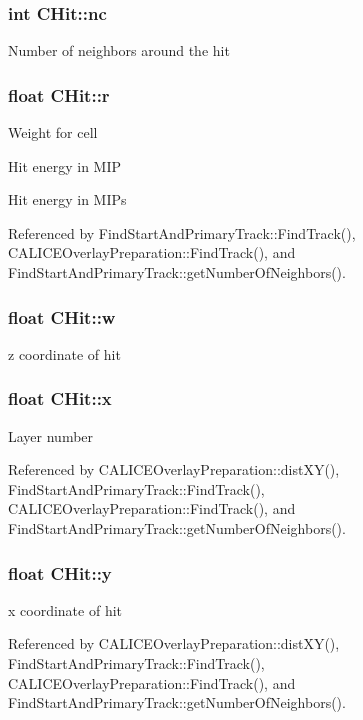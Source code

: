 \subsubsection[{nc}]{\setlength{\rightskip}{0pt plus 5cm}int C\-Hit\-::nc}\label{classCHit_a8002afb784c7f3be853bedfe66524d94}
Number of neighbors around the hit 
\subsubsection[{r}]{\setlength{\rightskip}{0pt plus 5cm}float C\-Hit\-::r}\label{classCHit_ac1bc0f62968053da2b6e42de30757397}
Weight for cell

Hit energy in M\-I\-P

Hit energy in M\-I\-Ps 

Referenced by Find\-Start\-And\-Primary\-Track\-::\-Find\-Track(), C\-A\-L\-I\-C\-E\-Overlay\-Preparation\-::\-Find\-Track(), and Find\-Start\-And\-Primary\-Track\-::get\-Number\-Of\-Neighbors().

\subsubsection[{w}]{\setlength{\rightskip}{0pt plus 5cm}float C\-Hit\-::w}\label{classCHit_af6ca2e2627dfdada60123b07d995f979}
z coordinate of hit 
\subsubsection[{x}]{\setlength{\rightskip}{0pt plus 5cm}float C\-Hit\-::x}\label{classCHit_a2d75c2ec6af4d1974d54dc7c95bb3769}
Layer number 

Referenced by C\-A\-L\-I\-C\-E\-Overlay\-Preparation\-::dist\-X\-Y(), Find\-Start\-And\-Primary\-Track\-::\-Find\-Track(), C\-A\-L\-I\-C\-E\-Overlay\-Preparation\-::\-Find\-Track(), and Find\-Start\-And\-Primary\-Track\-::get\-Number\-Of\-Neighbors().

\subsubsection[{y}]{\setlength{\rightskip}{0pt plus 5cm}float C\-Hit\-::y}\label{classCHit_a9ae960cc5bb59e64f41814c05501067f}
x coordinate of hit 

Referenced by C\-A\-L\-I\-C\-E\-Overlay\-Preparation\-::dist\-X\-Y(), Find\-Start\-And\-Primary\-Track\-::\-Find\-Track(), C\-A\-L\-I\-C\-E\-Overlay\-Preparation\-::\-Find\-Track(), and Find\-Start\-And\-Primary\-Track\-::get\-Number\-Of\-Neighbors().

